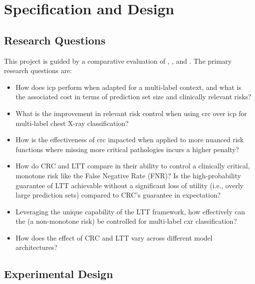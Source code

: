 \chapter{Specification and Design}
\label{ch:design}

\section{Research Questions}

This project is guided by a comparative evaluation of
, , and .
The primary research questions are:

\begin{itemize}
    \item How does \gls{icp} perform when adapted for a multi-label context,
    and what is the associated cost in terms of prediction set size and clinically relevant risks?

    \item What is the improvement in relevant risk control
    when using \gls{crc} over \gls{icp} for multi-label chest X-ray classification?

    \item How is the effectiveness of \gls{crc} impacted
    when applied to more nuanced risk functions
    where missing more critical pathologies incurs a higher penalty?

    \item How do CRC and LTT compare in their ability to control a clinically critical,
    monotone risk like the False Negative Rate (FNR)?
    Is the high-probability guarantee of LTT achievable without a significant loss of utility
    (i.e., overly large prediction sets) compared to CRC's guarantee in expectation?

    \item Leveraging the unique capability of the LTT framework,
    how effectively can the  (a non-monotone risk) be controlled
    for multi-label \gls{cxr} classification?

    \item How does the effect of CRC and LTT vary across different model architectures?


\end{itemize}

\section{Experimental Design}

